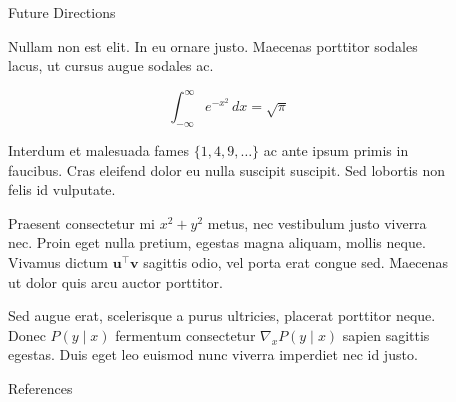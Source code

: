 \documentclass[final]{beamer}
\newlength{\sepwidth}
\newlength{\colwidth}
\newcommand{\separatorcolumn}{\begin{column}{\sepwidth}\end{column}}
\begin{document}
\begin{frame}[t]
\begin{columns}[t]
\begin{column}{\colwidth}
\end{column}

\separatorcolumn
\setlength{\colwidth}{0.25\paperwidth}
\begin{column}{\colwidth}

  \begin{alertblock}{Future Directions}

    Nullam non est elit. In eu ornare justo. Maecenas porttitor sodales lacus,
    ut cursus augue sodales ac.

    $$
    \int_{-\infty}^{\infty} e^{-x^2}\,dx = \sqrt{\pi}
    $$

    Interdum et malesuada fames $\{1, 4, 9, \ldots\}$ ac ante ipsum primis in
    faucibus. Cras eleifend dolor eu nulla suscipit suscipit. Sed lobortis non
    felis id vulputate.


    Praesent consectetur mi $x^2 + y^2$ metus, nec vestibulum justo viverra
    nec. Proin eget nulla pretium, egestas magna aliquam, mollis neque. Vivamus
    dictum $\mathbf{u}^\intercal\mathbf{v}$ sagittis odio, vel porta erat
    congue sed. Maecenas ut dolor quis arcu auctor porttitor.


    Sed augue erat, scelerisque a purus ultricies, placerat porttitor neque.
    Donec $P(y \mid x)$ fermentum consectetur $\nabla_x P(y \mid x)$ sapien
    sagittis egestas. Duis eget leo euismod nunc viverra imperdiet nec id
    justo.

  \end{alertblock}


  \begin{block}{References}

    \nocite{*}
    \footnotesize{}

  \end{block}

\end{column}

\separatorcolumn
\end{columns}
\end{frame}
\end{document}
